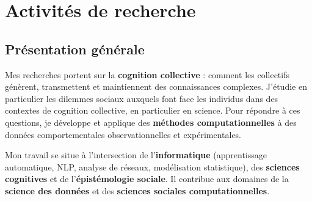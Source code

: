 \documentclass[11pt,a4paper]{article}
\begin{document}



\section{Activités de recherche}

\subsection{Présentation générale}

Mes recherches portent sur la \textbf{cognition collective} : comment les collectifs génèrent, transmettent et maintiennent des connaissances complexes. J'étudie en particulier les dilemmes sociaux auxquels font face les individus dans des contextes de cognition collective, en particulier en science. Pour répondre à ces questions, je développe et applique des \textbf{méthodes computationnelles} à des données comportementales observationnelles et expérimentales.

Mon travail se situe à l'intersection de l'\textbf{informatique} (apprentissage automatique, NLP, analyse de réseaux, modélisation statistique), des \textbf{sciences cognitives} et de l'\textbf{épistémologie sociale}. Il contribue aux domaines de la \textbf{science des données} et des \textbf{sciences sociales computationnelles}.
\end{document}
